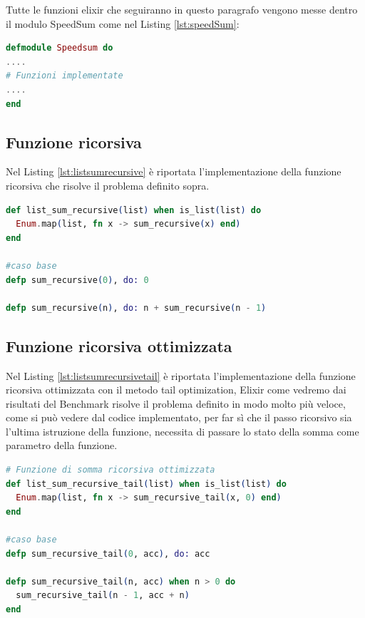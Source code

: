Tutte le funzioni elixir che seguiranno in questo paragrafo
vengono messe dentro il modulo SpeedSum
come nel Listing \ref{lst:speedSum}:

\begin{lstlisting}[language=elixir,captionpos=b,
	caption={Modulo di riferimento},
	label={lst:speedSum}]
defmodule Speedsum do
....
# Funzioni implementate
....
end


\end{lstlisting}


\subsection{Funzione ricorsiva}
Nel Listing \ref{lst:listsumrecursive} è riportata l'implementazione
della funzione ricorsiva che risolve il problema definito sopra.

\begin{lstlisting}[language=elixir,captionpos=b,
	caption={Funzione list\_sum\_recursive()},
	label={lst:listsumrecursive}]
def list_sum_recursive(list) when is_list(list) do
  Enum.map(list, fn x -> sum_recursive(x) end)
end

#caso base
defp sum_recursive(0), do: 0

defp sum_recursive(n), do: n + sum_recursive(n - 1)
\end{lstlisting}

\subsection{Funzione ricorsiva ottimizzata}
Nel Listing \ref{lst:listsumrecursivetail} è riportata l'implementazione
della funzione ricorsiva ottimizzata con il metodo tail optimization,
Elixir come vedremo dai risultati del Benchmark risolve il problema
definito in modo molto più veloce, come si può vedere dal codice
implementato, per far sì che il passo ricorsivo sia l'ultima
istruzione della funzione, necessita di passare lo stato della
somma come parametro della funzione.

\begin{lstlisting}[language=elixir,captionpos=b,
	caption={Funzione list\_sum\_recursive\_tail()},
	label={lst:listsumrecursivetail}]
# Funzione di somma ricorsiva ottimizzata
def list_sum_recursive_tail(list) when is_list(list) do
  Enum.map(list, fn x -> sum_recursive_tail(x, 0) end)
end
  
#caso base
defp sum_recursive_tail(0, acc), do: acc

defp sum_recursive_tail(n, acc) when n > 0 do
  sum_recursive_tail(n - 1, acc + n)
end
\end{lstlisting}

